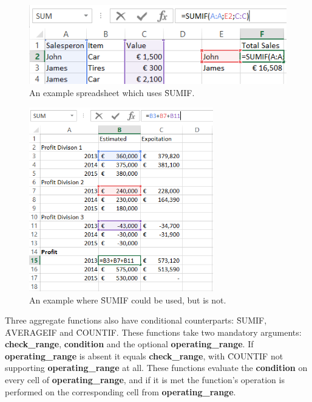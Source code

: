 \section{}
\label{refac:introduceconditionalaggregate}

\begin{figure}
\centering
\includegraphics{implementation/aggregate/sumifexample}
\caption{An example spreadsheet which uses \f{SUMIF}.}
\label{fig:sumifexample}
\end{figure}

\begin{figure}
	\centering
	\includegraphics[height=8cm]{implementation/aggregate/condaggrexample}
	\caption{An example where \f{SUMIF} could be used, but is not.}
	\label{fig:sumifexample}
\end{figure}

Three aggregate functions also have conditional counterparts: \f{SUMIF}, \f{AVERAGEIF} and \f{COUNTIF}.
These functions take two mandatory arguments: \textbf{check_range}, \textbf{condition} and the optional \textbf{operating_range}.
If \textbf{operating_range} is absent it equals \textbf{check_range}, with \f{COUNTIF} not supporting \textbf{operating_range} at all.
These functions evaluate the \textbf{condition} on every cell of \textbf{operating_range}, and if it is met the function's operation is performed on the corresponding cell from \textbf{operating_range}.

